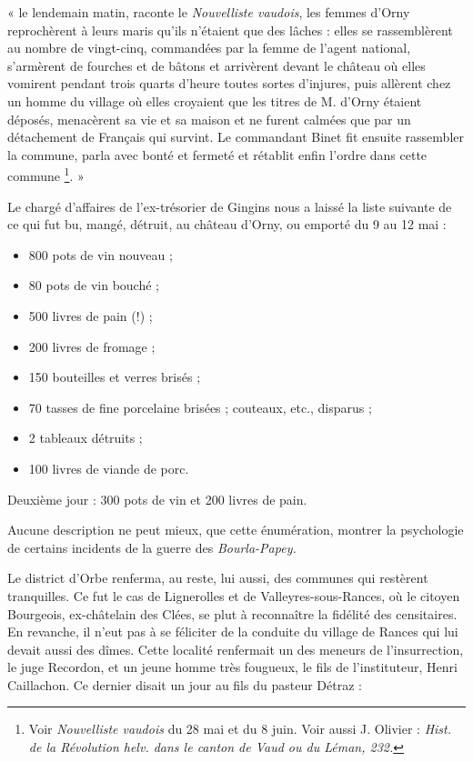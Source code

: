 \documentclass[french,twoside]{book} %
\newenvironment{quoteblock}%
  {\begin{quoting}}
  {\end{quoting}}
\newenvironment{quotebar}{%
    \def\FrameCommand{{\color{rubric!10!}\vrule width 0.5em} \hspace{0.9em}}%
    \def\OuterFrameSep{\itemsep} %
    \MakeFramed {\advance\hsize-\width \FrameRestore}
  }%
  {%
    \endMakeFramed
  }
\renewenvironment{quoteblock}%
  {%
    \savenotes
    \setstretch{0.9}
    \begin{quotebar}
  }
  {%
    \end{quotebar}
    \spewnotes
  }
\begin{document}
\begin{quoteblock}
\noindent « le lendemain matin, raconte le \emph{Nouvelliste vaudois}, les femmes d’Orny reprochèrent à leurs maris qu’ils n’étaient que des lâches : elles se rassemblèrent au nombre de vingt-cinq, commandées par la femme de l’agent national, s’armèrent de fourches et de bâtons et arrivèrent devant le château où elles vomirent pendant trois quarts d’heure toutes sortes d’injures, puis allèrent chez un homme du village où elles croyaient que les titres de M. d’Orny étaient déposés, menacèrent sa vie et sa maison et ne furent calmées que par un détachement de Français qui survint. Le commandant Binet fit ensuite rassembler la commune, parla avec bonté et fermeté et rétablit enfin l’ordre dans cette commune \footnote{Voir \emph{Nouvelliste vaudois} du 28 mai et du 8 juin. Voir aussi J. Olivier : \emph{Hist. de la Révolution helv. dans le canton de Vaud ou du Léman, 232.}}. »\end{quoteblock}

\noindent Le chargé d’affaires de l’ex-trésorier de Gingins nous a laissé la liste suivante de ce qui fut bu, mangé, détruit, au château d’Orny, ou emporté du 9 au 12 mai :\par

\begin{itemize}[itemsep=0pt,]
\item 800 pots de vin nouveau ;
\item 80 pots de vin bouché ;
\item 500 livres de pain (!) ;
\item 200 livres de fromage ;
\item 150 bouteilles et verres brisés ;
\item 70 tasses de fine porcelaine brisées ; couteaux, etc., disparus ;
\item 2 tableaux détruits ;
\item 100 livres de viande de porc.
\end{itemize}
\noindent Deuxième jour : 300 pots de vin et 200 livres de pain.\par
Aucune description ne peut mieux, que cette énumération, montrer la psychologie de certains incidents de la guerre des \emph{Bourla-Papey.}\par
Le district d’Orbe renferma, au reste, lui aussi, des communes qui restèrent tranquilles. Ce fut le cas de Lignerolles et de Valleyres-sous-Rances, où le citoyen Bourgeois, ex-châtelain des Clées, se plut à reconnaître la fidélité des censitaires. En revanche, il n’eut pas à se féliciter de la conduite du village de Rances qui lui devait aussi des dîmes. Cette localité renfermait un des meneurs de l’insurrection, le juge Recordon, et un jeune homme très fougueux, le fils de l’instituteur, Henri Caillachon. Ce dernier disait un jour au fils du pasteur Détraz :\par
\end{document}
